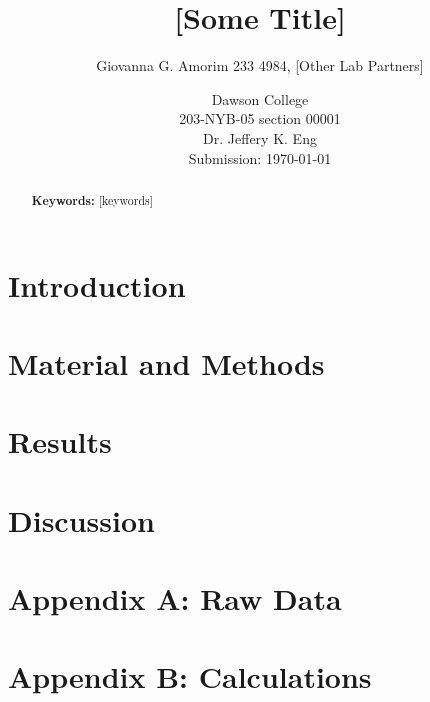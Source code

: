 \documentclass[letterpaper]{article}
\title{[Some Title]}
\author{Giovanna G. Amorim 233 4984, [Other Lab Partners]}
\date{Dawson College \\[15pt]
203-NYB-05 section 00001\\[15pt]
Dr. Jeffery K. Eng\\[15pt]
Submission: \today}
\begin{document}
\maketitle

\begin{abstract}
        
	\noindent\textbf{Keywords:} [keywords]
\end{abstract}

\tableofcontents

\newpage

\section{Introduction}
\label{sec:introduction}

\section{Material and Methods}
\label{sec:matandmet}

\section{Results}
\label{sec:results}

\section{Discussion}
\label{sec:discussion}


\section*{Appendix A: Raw Data}
\label{sec:appendixa}

\section*{Appendix B: Calculations}
\label{sec:appendixb}
\end{document}
